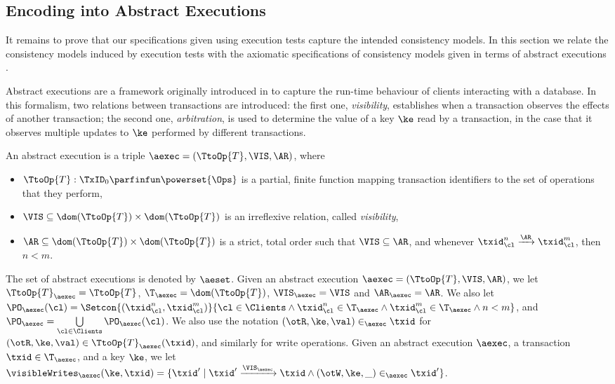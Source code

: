 \subsection{Encoding into Abstract Executions}
It remains to prove that our specifications given using execution tests 
capture the intended consistency models. 
In this section we relate the consistency models induced by execution tests with 
the axiomatic specifications of consistency models given in terms of abstract executions 
\cite{framework-concur,laws}. 

Abstract executions are a framework originally introduced in \cite{ev-transactions} 
to capture the run-time behaviour of clients interacting with a database. In this 
formalism, two relations between transactions are introduced: the first one, \emph{visibility}, 
establishes when a transaction observes the effects of another transaction; the 
second one,  \emph{arbitration}, is used to determine the value of a key $\ke$ read by 
a transaction, in the case that it observes multiple updates to $\ke$ performed by different 
transactions. 
\begin{definition}
\label{def:absexec}
\label{def:aexec}
An abstract execution is a triple $\aexec = (\TtoOp{T}, \VIS, \AR)$, where 
\begin{itemize}
    \item $\TtoOp{T}: \TxID_{0} \parfinfun \powerset{\Ops}$ is a partial, 
finite function mapping transaction identifiers to the set of operations that they perform,
\item $\VIS \subseteq \dom(\TtoOp{T}) \times \dom(\TtoOp{T})$ is an irreflexive relation, 
called \emph{visibility}, 
\item $\AR \subseteq \dom(\TtoOp{T}) \times \dom(\TtoOp{T})$ is a strict, total order 
such that $\VIS \subseteq \AR$, and whenever $\txid_{\cl}^{n} \xrightarrow{\AR} 
\txid_{\cl}^{m}$, then $n < m$.
\end{itemize} 
\end{definition}
The set of abstract executions is denoted by $\aeset$.
Given an abstract execution $\aexec = (\TtoOp{T}, \VIS, \AR)$, we let 
$\TtoOp{T}_{\aexec} = \TtoOp{T}$, $\T_{\aexec} = \dom(\TtoOp{T})$, $\VIS_{\aexec} = \VIS$ 
and $\AR_{\aexec} = \AR$. We also let $\PO_{\aexec}(\cl) = \Setcon{(\txid_{\cl}^{n}, \txid_{\cl}^{m})}{ \cl \in \Clients 
\wedge \txid_{\cl}^{n} \in \T_{\aexec} \wedge \txid_{\cl}^{m} \in \T_{\aexec} \wedge n < m}$, and 
$\PO_{\aexec} = \bigcup\limits_{\cl \in \Clients} \PO_{\aexec}(\cl)$.
We also use the notation $(\otR, \ke, \val) \in_{\aexec} \txid$ for $(\otR, \ke, \val) \in \TtoOp{T}_{\aexec}(\txid)$, 
and similarly for write operations. 
Given an abstract execution $\aexec$, a transaction $\txid \in \T_{\aexec}$, and a key $\ke$, 
we let $\visibleWrites_{\aexec}(\ke, \txid) = \{ \txid' \mid \txid' \xrightarrow{\VIS_{\aexec}} \txid \wedge 
(\otW, \ke, \_) \in_{\aexec} \txid'\}$.

